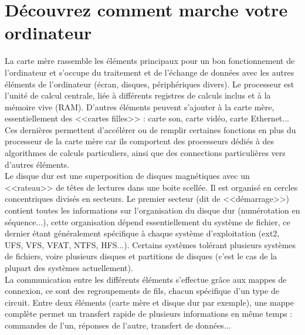 \documentclass[11pt,twoside,a4paper]{article}
\begin{document}
\section{D{\'e}couvrez comment marche votre ordinateur}
		La carte m{\`e}re rassemble les {\'e}l{\'e}ments principaux pour un bon fonctionnement de l'ordinateur et s'occupe du traitement et de l'{\'e}change de donn{\'e}es avec les autres {\'e}l{\'e}ments de l'ordinateur ({\'e}cran, disques, p{\'e}riph{\'e}riques divers). Le processeur est l'unit{\'e} de calcul centrale, li{\'e}e {\`a} diff{\'e}rents registres de calculs inclus et {\`a} la m{\'e}moire vive (RAM). D'autres {\'e}l{\'e}ments peuvent s'ajouter {\`a} la carte m{\`e}re, essentiellement des <<cartes filles>> : carte son, carte vid{\'e}o, carte Ethernet... Ces derni{\`e}res permettent d'acc{\'e}l{\'e}rer ou de remplir certaines fonctions en plus du processeur de la carte m{\`e}re car ils comportent des processeurs d{\'e}di{\'e}s {\`a} des algorithmes de calculs particuliers, ainsi que des connections particuli{\`e}res vers d'autres {\'e}l{\'e}ments. ~\\

		Le disque dur est une superposition de disques magn{\'e}tiques avec un <<rateau>> de t{\^e}tes de lectures dans une boite scell{\'e}e. Il est organis{\'e} en cercles concentriques divis{\'e}s en secteurs. Le premier secteur (dit de <<d{\'e}marrage>>) contient toutes les informations sur l'organisation du disque dur (num{\'e}rotation en s{\'e}quence...), cette organisation d{\'e}pend essentiellement du syst{\`e}me de fichier, ce dernier {\'e}tant g{\'e}n{\'e}ralement sp{\'e}cifique {\`a} chaque syst{\`e}me d'exploitation (ext2, UFS, VFS, VFAT, NTFS, HFS...). Certains syst{\`e}mes tol{\'e}rant plusieurs syst{\`e}mes de fichiers, voire plusieurs disques et partitions de disques (c'est le cas de la plupart des syst{\`e}mes actuellement). ~\\

		La communication entre les diff{\'e}rents {\'e}l{\'e}ments s'effectue gr{\^a}ce aux mappes de connexion, ce sont des regroupements de fils, chacun sp{\'e}cifique d'un type de circuit. Entre deux {\'e}l{\'e}ments (carte m{\`e}re et disque dur par exemple), une mappe compl{\`e}te permet un transfert rapide de plusieurs informations en m{\^e}me temps : commandes de l'un, r{\'e}ponses de l'autre, transfert de donn{\'e}es... 
\end{document}

